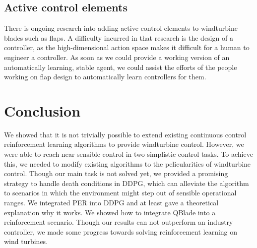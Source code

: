 \documentclass[hyperref,final,beleg]{cgvpub}
\begin{document}
\section{Active control elements}
There is ongoing research into adding active control elements to windturbine blades such as flaps. A difficulty incurred in that research is the design of a controller, as the high-dimensional action space makes it difficult for a human to engineer a controller. As soon as we could provide a working version of an automatically learning, stable agent, we could assist the efforts of the people working on flap design to automatically learn controllers for them.

\chapter{Conclusion}

We showed that it is not trivially possible to extend existing continuous control reinforcement learning algorithms to provide windturbine control. However, we were able to reach near sensible control in two simplistic control tasks. To achieve this, we needed to modify existing algorithms to the pelicularities of windturbine control. Though our main task is not solved yet, we provided a promising strategy to handle death conditions in \ac{DDPG}, which can alleviate the algorithm to scenarios in which the environment might step out of sensible operational ranges. We integrated \ac{PER} into \ac{DDPG} and at least gave a theoretical explanation why it works. We showed how to integrate QBlade into a reinforcement scenario. Though our results can not outperform an industry controller, we made some progress towards solving reinforcement learning on wind turbines.
\end{document}
